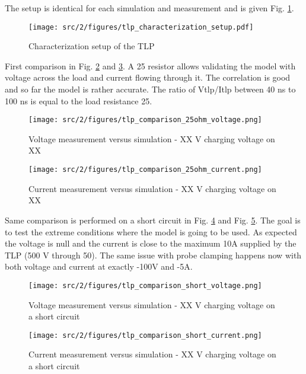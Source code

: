The setup is identical for each simulation and measurement and is given Fig. \ref{fig:setup-cz-tlp-model}.

\begin{figure}[!h]
  \centering
  \texttt{[image: src/2/figures/tlp\_characterization\_setup.pdf]}
  \caption{Characterization setup of the TLP}
  \label{fig:setup-cz-tlp-model}
\end{figure}

First comparison in Fig. \ref{fig:comparison-tlp-1-v} and \ref{fig:comparison-tlp-1-i}.
A 25\textOmega{} resistor allows validating the model with voltage across the load and current flowing through it.
The correlation is good and so far the model is rather accurate.
The ratio of Vtlp/Itlp between 40 ns to 100 ns is equal to the load resistance 25\textOmega{}.

\begin{figure}[!h]
  \centering
  \texttt{[image: src/2/figures/tlp\_comparison\_25ohm\_voltage.png]}
  \caption{Voltage measurement versus simulation - XX V charging voltage on XX\textOmega{}}
  \label{fig:comparison-tlp-1-v}
\end{figure}

\begin{figure}[!h]
  \centering
  \texttt{[image: src/2/figures/tlp\_comparison\_25ohm\_current.png]}
  \caption{Current measurement versus simulation - XX V charging voltage on XX\textOmega{}}
  \label{fig:comparison-tlp-1-i}
\end{figure}

Same comparison is performed on a short circuit in Fig. \ref{fig:comparison-tlp-short-v} and Fig. \ref{fig:comparison-tlp-short-i}.
The goal is to test the extreme conditions where the model is going to be used.
As expected the voltage is null and the current is close to the maximum 10A supplied by the TLP (500 V through 50\textOmega{}).
The same issue with probe clamping happens now with both voltage and current at exactly -100V and -5A.

\begin{figure}[!h]
  \centering
  \texttt{[image: src/2/figures/tlp\_comparison\_short\_voltage.png]}
  \caption{Voltage measurement versus simulation - XX V charging voltage on a short circuit}
  \label{fig:comparison-tlp-short-v}
\end{figure}

\begin{figure}[!h]
  \centering
  \texttt{[image: src/2/figures/tlp\_comparison\_short\_current.png]}
  \caption{Current measurement versus simulation - XX V charging voltage on a short circuit}
  \label{fig:comparison-tlp-short-i}
\end{figure}


